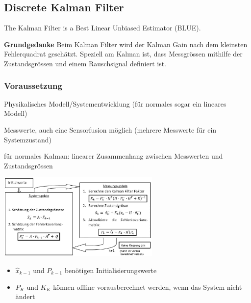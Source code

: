 \subsection{Discrete Kalman Filter }
The Kalman Filter is a Best Linear Unbiased Estimator (BLUE).

\textbf{Grundgedanke} Beim Kalman Filter wird der Kalman Gain nach dem
kleinsten Fehlerquadrat geschätzt. Speziell am Kalman ist, dass Messgrössen
mithilfe der Zustandsgrössen und einem Rauschsignal definiert ist. \\
\subsubsection{Voraussetzung}
\begin{aufzaehlung}
   	\item Physikalisches Modell/Systementwicklung (für normales sogar ein
   	lineares Modell)
   	\item Messwerte, auch eine Sensorfusion möglich (mehrere Messwerte für ein
   	Systemzustand)
   	\item für normales Kalman: linearer Zusammenhang zwischen Messwerten und
   	Zustandsgrössen
\end{aufzaehlung}
\begin{minipage}{8cm}
	\includegraphics[width=8cm]{Content/AdaptSigVer/KalmanFilter.jpg}
	
	\begin{itemize}
		\item $\hat{x}_{k-1}$ und $P_{k-1}$ benötigen Initialisierungswerte
		\item $P_K$ und $K_K$ können offline vorausberechnet werden, wenn das System nicht ändert
	\end{itemize}
	
\end{minipage}
